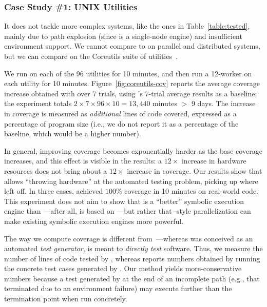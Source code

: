 \subsubsection{Case Study \#1: UNIX Utilities}
\label{sec:coreutils}

  It does not tackle more complex systems, like the ones in Table~\ref{table:tested}, mainly due to path explosion (since \klee is a single-node engine) and insufficient environment support.  We cannot compare \cnine to \klee on parallel and distributed systems, but we can compare on the Coreutils suite of \unix utilities~\cite{coreutils}.

We run \klee on each of the 96 utilities for 10 minutes, and then  run a 12-worker \cnine on each utility for 10 minutes. Figure~\ref{fig:coreutils-cov} reports the average coverage increase obtained with \cnine over 7 trials, using \klee's 7-trial average results as a baseline; the experiment totals $2 \times 7 \times 96 \times 10 = 13,440$ minutes $>$ 9 days.  The increase in coverage is measured as {\em additional} lines of code covered, expressed as a percentage of program size (i.e., we do not report it as a percentage of the baseline, which would be a higher number).

  In general, improving coverage becomes exponentially harder as the base coverage increases, and this effect is visible in the results: a $12\times$ increase in hardware resources does not bring about a $12\times$ increase in coverage.  Our results show that \cnine allows ``throwing hardware'' at the automated testing problem, picking up where \klee left off.  In three cases, \cnine achieved $100\%$ coverage in 10 minutes on real-world code.  This experiment does not aim to show that \cnine is a ``better'' symbolic execution engine than \klee---after all, \cnine is based on \klee---but rather that \cnine-style parallelization can make existing symbolic execution engines more powerful.

The way we compute coverage is different from~\cite{klee}---whereas \klee was conceived as an automated {\em test generator}, \cnine is meant to {\em directly test} software. Thus, we measure the number of lines of code tested by \cnine, whereas \cite{klee} reports numbers obtained by running the concrete test cases generated by \klee.  Our method yields more-conservative numbers because a test generated by \klee at the end of an incomplete path (e.g., that terminated due to an environment failure) may execute further than the termination point when run concretely.

